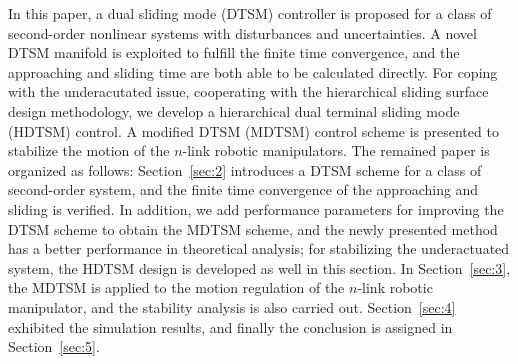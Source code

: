 \documentclass[3p]{elsarticle}
\theoremstyle{plain}
\theoremstyle{remark}
\begin{document}
In this paper, a dual sliding mode (DTSM) controller is proposed for a class of second-order nonlinear systems with disturbances and uncertainties. A novel DTSM manifold is exploited to fulfill the finite time convergence, and the approaching and sliding time are both able to be calculated directly. For coping with the underacutated issue, cooperating with the hierarchical sliding surface design methodology, we develop a hierarchical dual terminal sliding mode (HDTSM) control. A modified DTSM (MDTSM) control scheme is presented to stabilize the motion of the $n$-link robotic manipulators. The remained paper is organized as follows: Section~\ref{sec:2} introduces a DTSM scheme for a class of second-order system, and the finite time convergence of the approaching and sliding is verified. In addition, we add performance parameters for improving the DTSM scheme to obtain the MDTSM scheme, and the newly presented method has a better performance in theoretical analysis; for stabilizing the underactuated system, the HDTSM design is developed as well in this section. In Section~\ref{sec:3}, the MDTSM is applied to the motion regulation of the $n$-link robotic  manipulator, and the stability analysis is also carried out. Section~\ref{sec:4} exhibited the simulation results, and finally the conclusion is assigned in Section~\ref{sec:5}.
\end{document}
